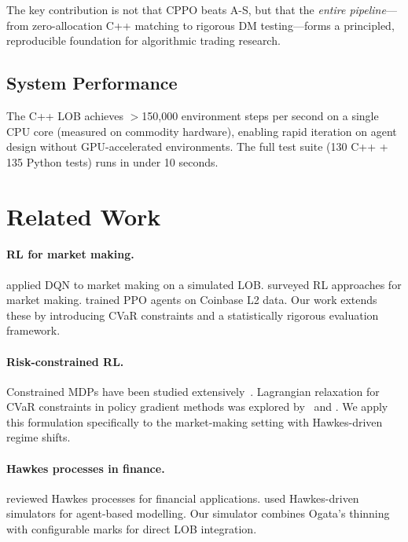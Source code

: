 \documentclass[11pt,twocolumn]{article}
\begin{document}
The key contribution is not that CPPO beats A-S, but that the
\emph{entire pipeline}---from zero-allocation C++ matching to
rigorous DM testing---forms a principled, reproducible foundation for
algorithmic trading research.

\subsection{System Performance}

The C++ LOB achieves $>$150,000 environment steps per second on a
single CPU core (measured on commodity hardware), enabling rapid
iteration on agent design without GPU-accelerated environments.
The full test suite (130 C++ + 135 Python tests) runs in under
10 seconds.

\section{Related Work}\label{sec:related}

\paragraph{RL for market making.}
\citet{spooner2018market} applied DQN to market making on a simulated
LOB.  \citet{gasperov2021market} surveyed RL approaches for market
making.  \citet{sadighian2020deep} trained PPO agents on Coinbase
L2 data.  Our work extends these by introducing CVaR constraints
and a statistically rigorous evaluation framework.

\paragraph{Risk-constrained RL.}
Constrained MDPs have been studied extensively~\citep{altman1999constrained}.
Lagrangian relaxation for CVaR constraints in policy
gradient methods was explored by~\citet{chow2017risk} and
\citet{tang2019worst}.  We apply this formulation specifically to
the market-making setting with Hawkes-driven regime shifts.

\paragraph{Hawkes processes in finance.}
\citet{bacry2015hawkes} reviewed Hawkes processes for financial
applications.  \citet{lu2018agent} used Hawkes-driven simulators for
agent-based modelling.  Our simulator combines Ogata's thinning with
configurable marks for direct LOB integration.
\end{document}
